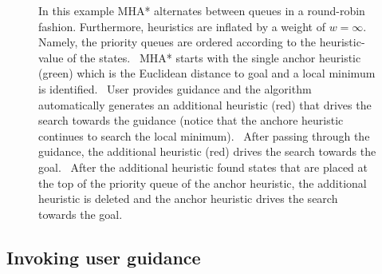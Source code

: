 \documentclass[conference]{IEEEtran}
\begin{document}
\begin{figure}[t]
{    %
    In this example MHA* alternates between queues in a round-robin fashion. Furthermore, heuristics are inflated by a weight of $w=\infty$. Namely, the priority queues are ordered according to the heuristic-value of the states.
	~MHA* starts with the single anchor heuristic (green) which is the Euclidean distance to goal and a local minimum is identified.
	~User provides guidance and the algorithm automatically generates an additional heuristic (red) that drives the search towards the guidance (notice that the anchore heuristic continues to search the local minimum).
	~After passing through the guidance, the additional heuristic (red) drives the search towards the goal.
	~After the additional heuristic found states that are placed at the top of the priority queue of the anchor heuristic, the additional heuristic is deleted and the anchor heuristic drives the search towards the goal.
  }%
  \label{fig:filmstrip-dynamic_heuristic}%
  \vspace{-2.5mm}
\end{figure}


\subsection{Invoking user guidance}
\label{sec:q1}
\end{document}
